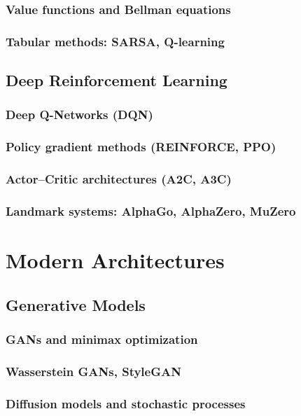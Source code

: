 \section{Value functions and Bellman equations}
\section{Tabular methods: SARSA, Q-learning}

\chapter{Deep Reinforcement Learning}
\section{Deep Q-Networks (DQN)}
\section{Policy gradient methods (REINFORCE, PPO)}
\section{Actor–Critic architectures (A2C, A3C)}
\section{Landmark systems: AlphaGo, AlphaZero, MuZero}

\part{Modern Architectures}

\chapter{Generative Models}
\section{GANs and minimax optimization}
\section{Wasserstein GANs, StyleGAN}
\section{Diffusion models and stochastic processes}
